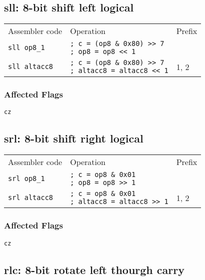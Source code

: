 \documentclass{book}
\begin{document}
\subsection{sll: 8-bit shift left logical}

\begin{tabular}{l l l}
Assembler code       & Operation                                                                       & Prefix \\
\texttt{sll op8\_1}  & \makecell{\texttt{; c = (op8 \& 0x80) >> 7}\\\texttt{; op8 = op8 << 1}}         & \\
\texttt{sll altacc8} & \makecell{\texttt{; c = (op8 \& 0x80) >> 7}\\\texttt{; altacc8 = altacc8 << 1}} & 1, 2
\end{tabular}

\subsubsection*{Affected Flags}

\texttt{cz}


\subsection{srl: 8-bit shift right logical}

\begin{tabular}{l l l}
Assembler code       & Operation                                                              & Prefix \\
\texttt{srl op8\_1}  & \makecell{\texttt{; c = op8 \& 0x01}\\\texttt{; op8 = op8 >> 1}}         & \\
\texttt{srl altacc8} & \makecell{\texttt{; c = op8 \& 0x01}\\\texttt{; altacc8 = altacc8 >> 1}} & 1, 2
\end{tabular}

\subsubsection*{Affected Flags}

\texttt{cz}


\subsection{rlc: 8-bit rotate left thourgh carry}
\end{document}
